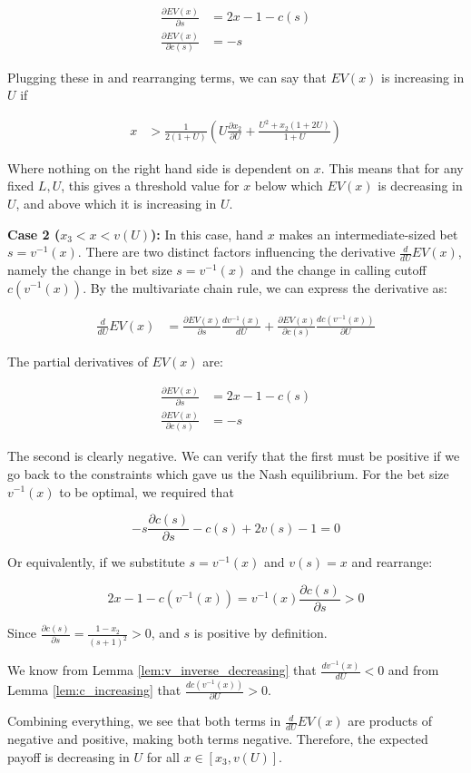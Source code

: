 \documentclass[../../main/main.tex]{subfiles}
\begin{document}
\begin{customproof}
    \begin{align*}
        \frac{\partial EV(x)}{\partial s} & = 2x - 1 - c(s) \\
        \frac{\partial EV(x)}{\partial c(s)} & = - s
    \end{align*}

    Plugging these in and rearranging terms, we can say that $EV(x)$ is increasing in $U$ if 

    \begin{align*}
        x & > \frac{1}{2(1+U)} \left( U \frac{\partial x_2}{\partial U} + \frac{U^2 + x_2(1 + 2U)}{1+U} \right)
    \end{align*}

    Where nothing on the right hand side is dependent on $x$. This means that for any fixed $L, U$, this gives a threshold value for $x$ below which $EV(x)$ is decreasing in $U$, and above which it is increasing in $U$.

    \textbf{Case 2 ($x_3 < x < v(U)$):} In this case, hand $x$ makes an intermediate-sized bet $s = v^{-1}(x)$. There are two distinct factors influencing the derivative $\frac{d}{dU} EV(x)$, namely the change in bet size $s = v^{-1}(x)$ and the change in calling cutoff $c(v^{-1}(x))$. By the multivariate chain rule, we can express the derivative as:

    \begin{align*}
        \frac{d}{dU} EV(x) & = \frac{\partial EV(x)}{\partial s} \frac{d v^{-1}(x)}{d U} + \frac{\partial EV(x)}{\partial c(s)} \frac{d c(v^{-1}(x))}{\partial U}
    \end{align*}

    The partial derivatives of $EV(x)$ are:

    \begin{align*}
        \frac{\partial EV(x)}{\partial s} & = 2x - 1 - c(s) \\
        \frac{\partial EV(x)}{\partial c(s)} & = - s
    \end{align*}

    The second is clearly negative. We can verify that the first must be positive if we go back to the constraints which gave us the Nash equilibrium. For the bet size $v^{-1}(x)$ to be optimal, we required that 

    $$ -s \frac{\partial c(s)}{\partial s} - c(s) + 2v(s) - 1 = 0$$

    Or equivalently, if we substitute $s= v^{-1}(x)$ and $v(s) = x$ and rearrange:

    $$ 2x -1 -c(v^{-1}(x)) = v^{-1}(x) \frac{\partial c(s)}{\partial s} > 0$$

    Since $\frac{\partial c(s)}{\partial s} = \frac{1-x_2}{(s+1)^2} > 0$, and $s$ is positive by definition.

    We know from Lemma \ref{lem:v_inverse_decreasing} that $\frac{d v^{-1}(x)}{d U} < 0$ and from Lemma \ref{lem:c_increasing} that $\frac{d c(v^{-1}(x))}{\partial U} > 0$.

    Combining everything, we see that both terms in $\frac{d}{dU} EV(x)$ are products of negative and positive, making both terms negative. Therefore, the expected payoff is decreasing in $U$ for all $x \in [x_3, v(U)]$.

\end{customproof}
\end{document}
